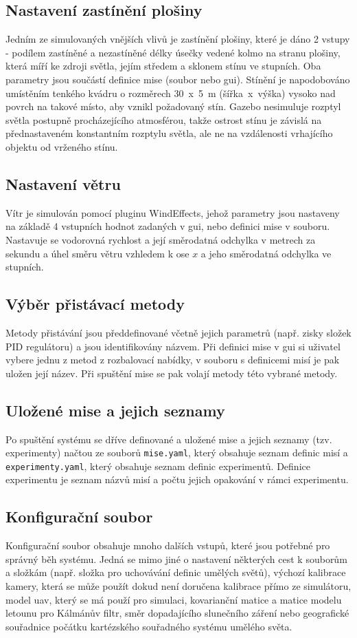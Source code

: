     \subsection{Nastavení zastínění plošiny}
      Jedním ze simulovaných vnějších vlivů je zastínění plošiny, které je dáno 2 vstupy - podílem zastíněné a nezastíněné délky úsečky vedené kolmo na stranu plošiny, která míří ke zdroji světla, jejím středem a sklonem stínu ve stupních. Oba parametry jsou součástí definice mise (soubor nebo \acrshort{gui}). Stínění je napodobováno umístěním tenkého kvádru o rozměrech 30~x~5~m (šířka~x~výška) vysoko nad povrch na takové místo, aby vznikl požadovaný stín. Gazebo nesimuluje rozptyl světla postupně procházejícího atmosférou, takže ostrost stínu je závislá na přednastaveném konstantním rozptylu světla, ale ne na vzdálenosti vrhajícího objektu od vrženého stínu.
    \subsection{Nastavení větru}
      Vítr je simulován pomocí pluginu WindEffects, jehož parametry jsou nastaveny na základě 4 vstupních hodnot zadaných v \acrshort{gui}, nebo definici mise v souboru. Nastavuje se vodorovná rychlost a její směrodatná odchylka v metrech za sekundu a úhel směru větru vzhledem k ose $x$ a jeho směrodatná odchylka ve stupních.
    \subsection{Výběr přistávací metody}
      Metody přistávání jsou předdefinované včetně jejich parametrů (např. zisky složek PID regulátoru) a jsou identifikovány názvem. Při definici mise v \acrshort{gui} si uživatel vybere jednu z metod z rozbalovací nabídky, v souboru s definicemi misí je pak uložen její název. Při spuštění mise se pak volají metody této vybrané metody.
    \subsection{Uložené mise a jejich seznamy} \label{sec:saved}
      Po spuštění systému se dříve definované a uložené mise a jejich seznamy (tzv. experimenty) načtou ze souborů \texttt{mise.yaml}, který obsahuje seznam definic misí a \texttt{experimenty.yaml}, který obsahuje seznam definic experimentů. Definice experimentu je seznam názvů misí a počtu jejich opakování v rámci experimentu.
    \subsection{Konfigurační soubor}
      Konfigurační soubor obsahuje mnoho dalších vstupů, které jsou potřebné pro správný běh systému. Jedná se mimo jiné o nastavení některých cest k souborům a složkám (např. složka pro uchovávání definic umělých světů), výchozí kalibrace kamery, která se může použít dokud není doručena kalibrace přímo ze simulátoru, model \acrshort{uav}, který se má použí pro simulaci, kovarianční matice a matice modelu letounu pro Kálmánův filtr, směr dopadajícího slunečního záření nebo geografické souřadnice počátku kartézského souřadného systému umělého světa.
